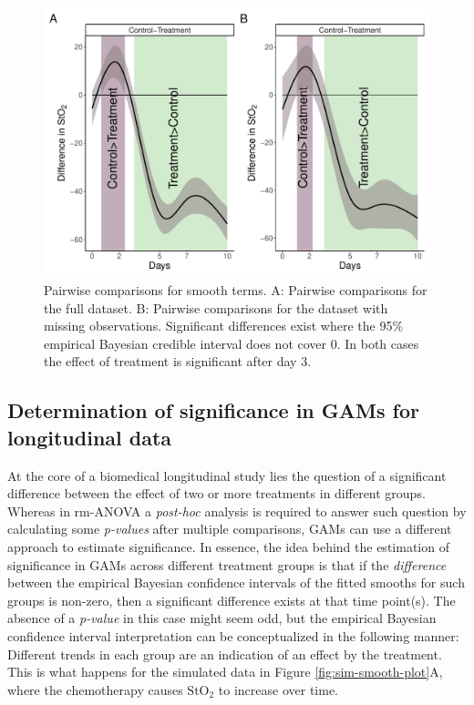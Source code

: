 \documentclass[
]{article}
\begin{document}
\begin{figure}

{\centering \includegraphics[width=0.75\linewidth]{SIM_Appendix_files/figure-latex/plot-pairwise-comp-1} 

}

\caption{Pairwise comparisons for smooth terms. A: Pairwise comparisons for the full dataset. B: Pairwise comparisons for the dataset with missing observations. Significant differences exist where the 95\% empirical Bayesian credible interval does not cover 0. In both cases the effect of treatment is significant after day 3.}\label{fig:plot-pairwise-comp}
\end{figure}

\hypertarget{GAM-significance}{%
\subsection{Determination of significance in GAMs for longitudinal data}\label{GAM-significance}}

At the core of a biomedical longitudinal study lies the question of a significant difference between the effect of two or more treatments in different groups. Whereas in rm-ANOVA a \emph{post-hoc} analysis is required to answer such question by calculating some \emph{p-values} after multiple comparisons, GAMs can use a different approach to estimate significance. In essence, the idea behind the estimation of significance in GAMs across different treatment groups is that if the \emph{difference} between the empirical Bayesian confidence intervals of the fitted smooths for such groups is non-zero, then a significant difference exists at that time point(s). The absence of a \emph{p-value} in this case might seem odd, but the empirical Bayesian confidence interval interpretation can be conceptualized in the following manner: Different trends in each group are an indication of an effect by the treatment. This is what happens for the simulated data in Figure \ref{fig:sim-smooth-plot}A, where the chemotherapy causes \(\mbox{StO}_2\) to increase over time.
\end{document}
